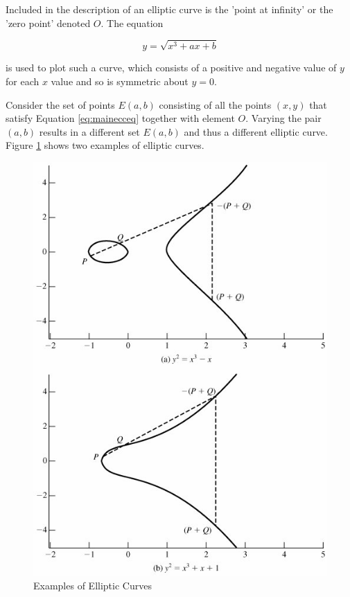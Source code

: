 \documentclass[a4paper,12pt]{report}
\begin{document}
Included in the description of an elliptic curve is the 'point at infinity' or the 'zero point' denoted $O$. The equation

\[y = \sqrt{x^3 + ax + b}\]

is used to plot such a curve, which consists of a positive and negative value of $y$ for each $x$ value and so is symmetric about $y=0$. 

Consider the set of points $E(a,b)$ consisting of all the points $(x,y)$ that satisfy Equation \ref{eq:mainecceq} together with element $O$. Varying the pair $(a,b)$ results in a different set $E(a,b)$ and thus a different elliptic curve. Figure \ref{fig:eccbaseexample} shows two examples of elliptic curves. 

\begin{figure}[htb]
\centering
\includegraphics[scale=0.7]{images/eccbaseexample.jpg}
\caption{Examples of Elliptic Curves}
\label{fig:eccbaseexample}
\end{figure}
\end{document}
